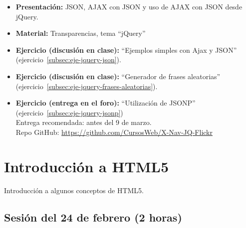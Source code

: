 \documentclass[a4paper,12pt]{report}
\begin{document}
\begin{itemize}
\item \textbf{Presentación:} JSON, AJAX con JSON y uso de AJAX con JSON desde jQuery.
\item \textbf{Material:} Transparencias, tema ``jQuery''
\item \textbf{Ejercicio (discusión en clase):} ``Ejemplos simples con Ajax y JSON'' (ejercicio~\ref{subsec:eje-jquery-json}).
\item \textbf{Ejercicio (discusión en clase):} ``Generador de frases aleatorias'' (ejercicio~\ref{subsec:eje-jquery-frases-aleatorias}).
\item \textbf{Ejercicio (entrega en el foro):} ``Utilización de JSONP'' (ejercicio~\ref{subsec:eje-jquery-jsonp}) \\
  Entrega recomendada: antes del 9 de marzo. \\
  Repo GitHub: \url{https://github.com/CursosWeb/X-Nav-JQ-Flickr}
\end{itemize}


\section{Introducción a HTML5}

Introducción a algunos conceptos de HTML5.

\subsection{Sesión del 24 de febrero (2 horas)}
\end{document}
